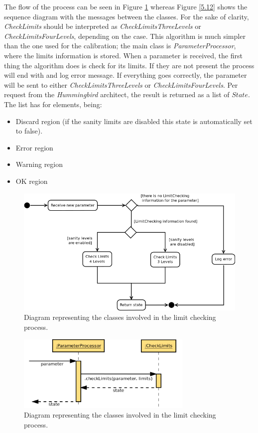 The flow of the process can be seen in Figure \ref{f5.11} whereas Figure \ref{5.12} shows the sequence diagram with the messages between the classes. For the sake of clarity, \emph{CheckLimits} should be interpreted as \emph{CheckLimitsThreeLevels} or \emph{CheckLimitsFourLevels}, depending on the case. This algorithm is much simpler than the one used for the calibration; the main class is \emph{ParameterProcessor}, where the limits information is stored. When a parameter is received, the first thing the algorithm does is check for its limits. If they are not present the process will end with and log error message. If everything goes correctly, the parameter will be sent to either \emph{CheckLimitsThreeLevels} or \emph{CheckLimitsFourLevels}.
Per request from the \emph{Hummingbird} architect, the result is returned as a list of $State$. The list has for elements, being:
\begin{itemize}
\item Discard region (if the sanity limits are disabled this state is automatically set to false).
\item Error region
\item Warning region
\item OK region
\end{itemize}

\begin{figure}[H]
\centerline{\includegraphics[width=1\textwidth]{images/LimitCheckingFlowChart.png}}
\caption{Diagram representing the classes involved in the limit checking process.}
\label{f5.11}
\end{figure}


\begin{figure}[H]
\centerline{\includegraphics[width=0.75\textwidth]{images/CheckLimitsSequence.png}}
\caption{Diagram representing the classes involved in the limit checking process.}
\label{f5.12}
\end{figure}
\newpage

